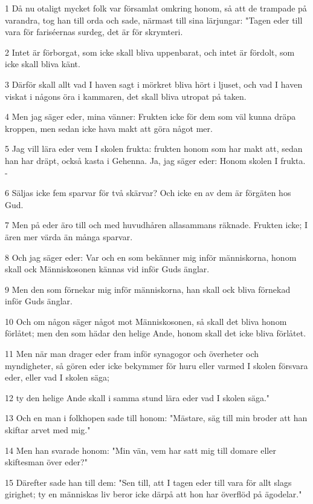\par 1 Då nu otaligt mycket folk var församlat omkring honom, så att de trampade på varandra, tog han till orda och sade, närmast till sina lärjungar: "Tagen eder till vara för fariséernas surdeg, det är för skrymteri.
\par 2 Intet är förborgat, som icke skall bliva uppenbarat, och intet är fördolt, som icke skall bliva känt.
\par 3 Därför skall allt vad I haven sagt i mörkret bliva hört i ljuset, och vad I haven viskat i någons öra i kammaren, det skall bliva utropat på taken.
\par 4 Men jag säger eder, mina vänner: Frukten icke för dem som väl kunna dräpa kroppen, men sedan icke hava makt att göra något mer.
\par 5 Jag vill lära eder vem I skolen frukta: frukten honom som har makt att, sedan han har dräpt, också kasta i Gehenna. Ja, jag säger eder: Honom skolen I frukta. -
\par 6 Säljas icke fem sparvar för två skärvar? Och icke en av dem är förgäten hos Gud.
\par 7 Men på eder äro till och med huvudhåren allasammans räknade. Frukten icke; I ären mer värda än många sparvar.
\par 8 Och jag säger eder: Var och en som bekänner mig inför människorna, honom skall ock Människosonen kännas vid inför Guds änglar.
\par 9 Men den som förnekar mig inför människorna, han skall ock bliva förnekad inför Guds änglar.
\par 10 Och om någon säger något mot Människosonen, så skall det bliva honom förlåtet; men den som hädar den helige Ande, honom skall det icke bliva förlåtet.
\par 11 Men när man drager eder fram inför synagogor och överheter och myndigheter, så gören eder icke bekymmer för huru eller varmed I skolen försvara eder, eller vad I skolen säga;
\par 12 ty den helige Ande skall i samma stund lära eder vad I skolen säga."
\par 13 Och en man i folkhopen sade till honom: "Mästare, säg till min broder att han skiftar arvet med mig."
\par 14 Men han svarade honom: "Min vän, vem har satt mig till domare eller skiftesman över eder?"
\par 15 Därefter sade han till dem: "Sen till, att I tagen eder till vara för allt slags girighet; ty en människas liv beror icke därpå att hon har överflöd på ägodelar."
